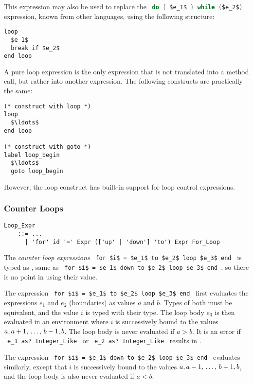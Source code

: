 This expression may also be used to replace the ~\lstinline[language=Java]!do { $e_1$ } while ($e_2$)!~ expression, known from other languages, using the following structure: 
\begin{lstlisting}
loop
  $e_1$
  break if $e_2$
end loop
\end{lstlisting}

A pure loop expression is the only expression that is not translated into a method call, but rather into another expression. The following constructs are practically the same: 
\begin{lstlisting}
(* construct with loop *)
loop
  $\ldots$
end loop

(* construct with goto *)
label loop_begin
  $\ldots$
  goto loop_begin
\end{lstlisting}
However, the loop construct has built-in support for loop control expressions. 





\subsubsection{Counter Loops}

\grammar\begin{lstlisting}
Loop_Expr 
    ::= ...
      | 'for' id '=' Expr (['up' | 'down'] 'to') Expr For_Loop
\end{lstlisting}

The {\em counter loop expressions} ~\lstinline!for $i$ = $e_1$ to $e_2$ loop $e_3$ end!~ is typed as , same as ~\lstinline!for $i$ = $e_1$ down to $e_2$ loop $e_3$ end!~, so there is no point in using their value. 

The expression ~\lstinline!for $i$ = $e_1$ to $e_2$ loop $e_3$ end!~ first evaluates the expressions $e_1$ and $e_2$ (boundaries) as  values $a$ and $b$. Types of both must be equivalent, and the value $i$ is typed with their type. The loop body $e_3$ is then evaluated in an environment where $i$ is successively bound to the values $a, a+1 ,\, \ldots ,\, b-1, b$. The loop body is never evaluated if $a > b$. It is an error if ~\lstinline!e_1 as? Integer_Like!~ or ~\lstinline!e_2 as? Integer_Like!~ results in . 

The expression ~\lstinline!for $i$ = $e_1$ down to $e_2$ loop $e_3$ end!~ evaluates similarly, except that $i$ is successively bound to the values $a, a-1 ,\, \ldots ,\, b+1, b$, and the loop body is also never evaluated if $a < b$. 

